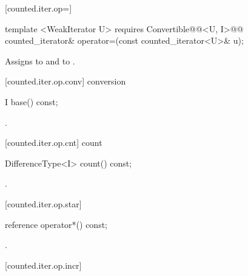 \begin{addedblock}
[counted.iter.op=]{}

%
%
\begin{itemdecl}
template <WeakIterator U>
  requires Convertible@@<U, I>@\newtxt{()}@
counted_iterator& operator=(const counted_iterator<U>& u);
\end{itemdecl}

\begin{itemdescr}
\pnum
\effects Assigns  to
 and  to .

\end{itemdescr}

[counted.iter.op.conv]{ conversion}

%
%
\begin{itemdecl}
I base() const;
\end{itemdecl}

\begin{itemdescr}
\pnum
\returns {}.
\end{itemdescr}

[counted.iter.op.cnt]{ count}

%
%
\begin{itemdecl}
DifferenceType<I> count() const;
\end{itemdecl}

\begin{itemdescr}
\pnum
\returns {}.
\end{itemdescr}

[counted.iter.op.star]{}

%
%
\begin{itemdecl}
reference operator*() const;
\end{itemdecl}

\begin{itemdescr}
\pnum
\returns {}.
\end{itemdescr}

[counted.iter.op.incr]{}


\end{addedblock}
